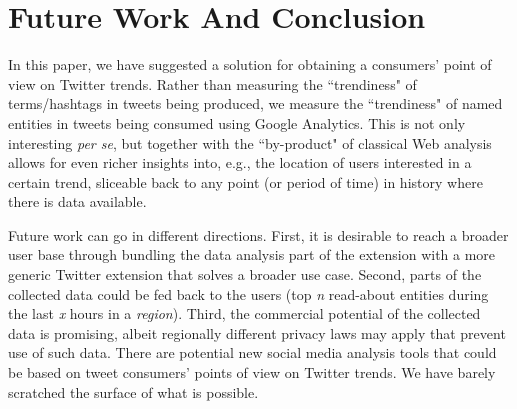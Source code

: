 \documentclass[runningheads,a4paper]{llncs}
\begin{document}

\section{Future Work And Conclusion}\label{sec:conclusion}
In this paper, we have suggested a solution for obtaining a consumers' point of view on Twitter trends. Rather than measuring the ``trendiness" of terms/hashtags in tweets being produced, we measure the ``trendiness" of named entities in tweets being consumed using Google Analytics. This is not only interesting \textit{per se}, but together with the ``by-product" of classical Web analysis allows for even richer insights into, e.g., the location of users interested in a certain trend, sliceable back to any point (or period of time) in history where there is data available.

Future work can go in different directions. First, it is desirable to reach a broader user base through bundling the data analysis part of the extension with a more generic Twitter extension that solves a broader use case. Second, parts of the collected data could be fed back to the users (top \textit{n} read-about entities during the last \textit{x} hours in a \textit{region}). Third, the commercial potential of the collected data is promising, albeit regionally different privacy laws may apply that prevent use of such data. There are potential new social media analysis tools that could be based on tweet consumers' points of view on Twitter trends. We have barely scratched the surface of what is possible.



\end{document}
